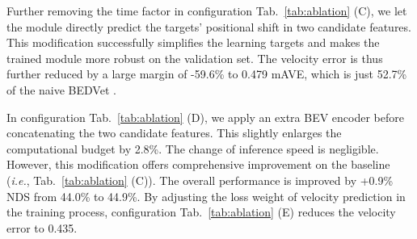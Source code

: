 \documentclass[10pt,twocolumn,letterpaper]{article}
\begin{document}
\begin{table*}[t]
  \centering
  \caption{Ablation study for the position of temporal fusion in BEVDet4D on the nuScenes \texttt{val} set.}

  \label{tab:pfs}\end{table*}


Further removing the time factor in configuration Tab.~\ref{tab:ablation} (C), we let the module directly predict the targets' positional shift in two candidate features. This modification successfully simplifies the learning targets and makes the trained module more robust on the validation set. The velocity error is thus further reduced by a large margin of -59.6\% to 0.479 mAVE, which is just 52.7\% of the naive BEDVet \cite{BEVDet}.

In configuration Tab.~\ref{tab:ablation} (D), we apply an extra BEV encoder before concatenating the two candidate features. This slightly enlarges the computational budget by 2.8\%. The change of inference speed is negligible. However, this modification offers comprehensive improvement on the baseline (\textit{i.e.}, Tab.~\ref{tab:ablation} (C)). The overall performance is improved by +0.9\% NDS from 44.0\% to 44.9\%. By adjusting the loss weight of velocity prediction in the training process, configuration Tab.~\ref{tab:ablation} (E) reduces the velocity error to 0.435.
\end{document}

